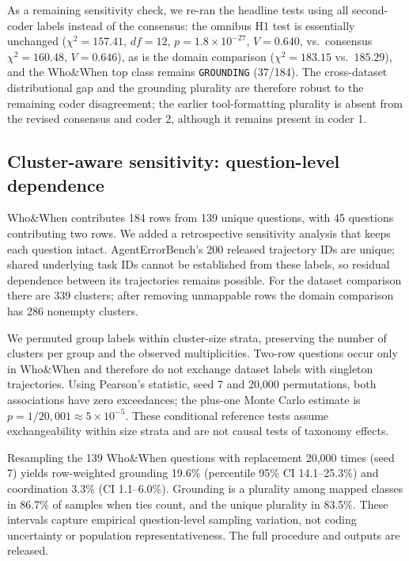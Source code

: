 \documentclass[12pt,letterpaper]{article}
\begin{document}
As a remaining sensitivity check, we re-ran the headline tests using all
second-coder labels instead of the consensus: the omnibus H1 test is
essentially unchanged ($\chi^2{=}157.41$, $df{=}12$,
$p{=}1.8\times10^{-27}$, $V{=}0.640$, vs.\ consensus $\chi^2{=}160.48$,
$V{=}0.646$), as is the domain comparison
($\chi^2{=}183.15$ vs.\ $185.29$), and the Who\&When top class remains
\texttt{GROUNDING} (37/184). The cross-dataset distributional gap and the
grounding plurality are therefore robust to the remaining coder
disagreement; the earlier tool-formatting plurality is absent from the revised
consensus and coder 2, although it remains present in coder 1.

\subsection{Cluster-aware sensitivity: question-level dependence}
\label{sec:cluster}
Who\&When contributes 184 rows from 139 unique questions, with 45 questions
contributing two rows. We added a retrospective sensitivity analysis that
keeps each question intact. AgentErrorBench's 200 released trajectory IDs
are unique; shared underlying task IDs cannot be established from these
labels, so residual dependence between its trajectories remains possible.
For the dataset comparison there are 339 clusters; after removing
unmappable rows the domain comparison has 286 nonempty clusters.

We permuted group labels within cluster-size strata, preserving the number
of clusters per group and the observed multiplicities. Two-row questions
occur only in Who\&When and therefore do not exchange dataset labels with
singleton trajectories. Using Pearson's statistic, seed 7 and 20,000
permutations, both associations have zero exceedances; the plus-one Monte
Carlo estimate is $p{=}1/20{,}001\approx5\times10^{-5}$. These conditional
reference tests assume exchangeability within size strata and are not
causal tests of taxonomy effects.

Resampling the 139 Who\&When questions with replacement 20,000 times
(seed 7) yields row-weighted grounding 19.6\% (percentile 95\% CI
14.1--25.3\%) and coordination 3.3\% (CI 1.1--6.0\%). Grounding is a
plurality among mapped classes in 86.7\% of samples when ties count,
and the unique plurality in 83.5\%. These intervals capture empirical
question-level sampling variation, not coding uncertainty or population
representativeness. The full procedure and outputs are released.
\end{document}
